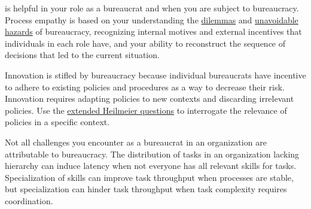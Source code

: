 

\iftoggle{glossarysubstitutionworks}{\Gls{process empathy}}{Process empathy} 
is helpful in your role as a bureaucrat and when you are subject to bureaucracy. 
Process empathy is based on your understanding the \hyperref[sec:dilemma-trilemma]{dilemmas} and \hyperref[sec:unavoidable-hazards]{unavoidable hazards} of bureaucracy, recognizing internal \gls{motives} and external \gls{incentives} that individuals in each role have, and your ability to reconstruct the sequence of decisions that led to the current situation. 


Innovation is stifled by bureaucracy%
\iftoggle{haspagenumbers}{ (see page~\pageref{sec:innovation})}{} because individual bureaucrats have incentive to adhere to existing policies and procedures as a way to decrease their risk. Innovation requires adapting policies to new contexts and discarding irrelevant policies. 
Use the \hyperref[sec:extending-Heilmeier]{extended Heilmeier questions}%
\iftoggle{haspagenumbers}{ (see page~\pageref{sec:extending-Heilmeier})}{} to interrogate the relevance of policies in a specific context.


Not all challenges you encounter as a bureaucrat in an organization are attributable to bureaucracy. The distribution of tasks in an organization lacking hierarchy can induce latency when not everyone has all relevant skills for tasks. Specialization of skills can improve task throughput when processes are stable, but specialization can hinder task throughput when task complexity requires coordination.

